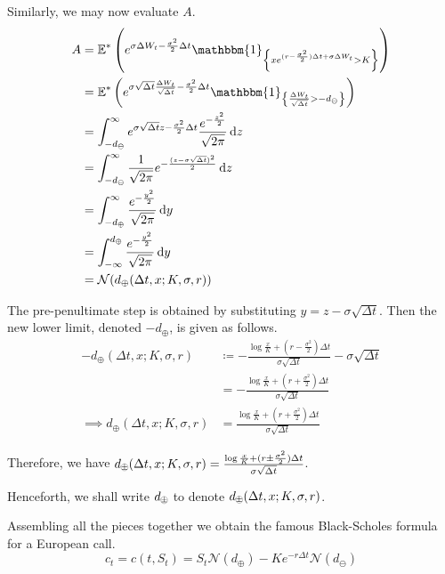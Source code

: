 Similarly, we may now evaluate $ A $.
\begin{align*}
	A  &=  \E^* \left( e^{ \sigma \Delta W_t - \frac{\sigma^2}{2} \Delta t }  \mathbbm{1}_{ \left\lbrace  x e^{ ( r - \frac{\sigma^2}{2} ) \Delta t + \sigma \Delta W_t } > K  \right\rbrace }  \right)  \\
	&=  \E^* \left( e^{ \sigma \sqrt{\Delta t} \frac{ \Delta W_t }{ \sqrt{\Delta t} } - \frac{\sigma^2}{2} \Delta t }  \mathbbm{1}_{ \left\lbrace  \frac{ \Delta W_t }{ \sqrt{\Delta t} }  >  - d_{\ominus}  \right\rbrace }  \right)  \\
	&=  \int_{- d_{\ominus}}^{\infty}  e^{ \sigma \sqrt{\Delta t} z - \frac{\sigma^2}{2} \Delta t } \frac{ e^{-\frac{z^2}{2}} }{ \sqrt{2 \pi} } \dif z  \\
	&=  \int_{- d_{\ominus}}^{\infty}  \frac{ 1 }{ \sqrt{2 \pi} }  e^{- \frac{ ( z - \sigma \sqrt{\Delta t } )^2 }{2} }  \dif z  \\
	&=  \int_{- d_{\oplus}}^{\infty}  \frac{ e^{-\frac{y^2}{2}} }{ \sqrt{2 \pi} }  \dif y  \\
	&=  \int_{- \infty}^{d_{\oplus}}  \frac{ e^{-\frac{y^2}{2}} }{ \sqrt{2 \pi} }  \dif y  \\
	&=  \mathcal{N}(d_{\oplus} ( \Delta t, x; K, \sigma, r ))
\end{align*}

The pre-penultimate step is obtained by substituting $ y = z - \sigma \sqrt{\Delta t } $. Then the new lower limit, denoted $ - d_{\oplus} $, is given as follows.
\begin{align*}
	- d_{\oplus} ( \Delta t, x; K, \sigma, r )  & \coloneqq  - \frac{ \log \frac{x}{K} + ( r - \frac{\sigma^2}{2} ) \Delta t }{ \sigma \sqrt{\Delta t} } - \sigma \sqrt{\Delta t }  \\
	&=  - \frac{ \log \frac{x}{K} + ( r + \frac{\sigma^2}{2} ) \Delta t }{ \sigma \sqrt{\Delta t} }  \\
	\implies  d_{\oplus} ( \Delta t, x; K, \sigma, r )  &=  \frac{ \log \frac{x}{K} + ( r + \frac{\sigma^2}{2} ) \Delta t }{ \sigma \sqrt{\Delta t} }
\end{align*}

Therefore, we have $ d_{\opm} ( \Delta t, x; K, \sigma, r )  =  \frac{ \log \frac{x}{K} + ( r \pm \frac{\sigma^2}{2} ) \Delta t }{ \sigma \sqrt{\Delta t} } $.

Henceforth, we shall write $ d_{\opm} $ to denote $ d_{\opm} ( \Delta t, x; K, \sigma, r ) $.

Assembling all the pieces together we obtain the famous Black-Scholes formula for a European call.
\begin{equation}
	\label{eq:continous-call-pr}
	c_t = c(t, S_t) = S_t \mathcal{N}(d_{\oplus}) - K e^{-r \Delta t} \mathcal{N}(d_{\ominus})
\end{equation}


